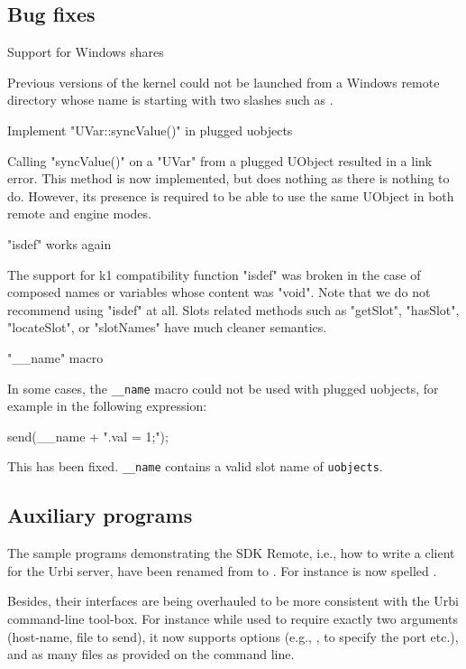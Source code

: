 \subsection{Bug fixes}
\begin{description}
\item Support for Windows shares

  Previous versions of the kernel could not be launched from a Windows
  remote directory whose name is starting with two slashes such as
  .

\item Implement "UVar::syncValue()" in plugged uobjects

  Calling "syncValue()" on a "UVar" from a plugged UObject resulted in a
  link error.  This method is now implemented, but does nothing as there is
  nothing to do. However, its presence is required to be able to use the
  same UObject in both remote and engine modes.

\item "isdef" works again

  The support for k1 compatibility function "isdef" was broken in the case
  of composed names or variables whose content was "void". Note that we do
  not recommend using "isdef" at all. Slots related methods such as
  "getSlot", "hasSlot", "locateSlot", or "slotNames" have much cleaner
  semantics.

\item "\_\_name" macro

  In some cases, the \lstinline|__name| macro could not be used with
  plugged uobjects, for example in the following expression:

\begin{urbiunchecked}
send(__name + ".val = 1;");
\end{urbiunchecked}
  \noindent
  This has been fixed. \lstinline|__name| contains a valid slot name
  of \lstinline|uobjects|.
\end{description}

\subsection{Auxiliary programs}

The sample programs demonstrating the SDK Remote, i.e., how to write a
client for the Urbi server, have been renamed from  to
.  For instance  is now spelled
.

Besides, their interfaces are being overhauled to be more consistent with
the Urbi command-line tool-box.  For instance while  used
to require exactly two arguments (host-name, file to send), it now supports
options (e.g., ,  to specify the port etc.),
and as many files as provided on the command line.



